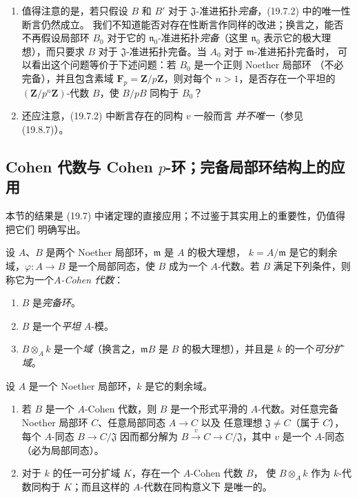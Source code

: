 \begin{remarks}[19.7.3]
\label{0.19.7.3-fr}
\begin{enumerate}
  \item[(i)] 值得注意的是，若只假设 $B$ 和 $B'$ 对于
  $\mathfrak J$-准进拓扑\emph{完备}，(19.7.2) 中的唯一性断言仍然成立。
  我们不知道能否对存在性断言作同样的改进；换言之，能否不再假设局部环
  $B_0$ 对于它的 $\mathfrak n_0$-准进拓扑\emph{完备}（这里
  $\mathfrak n_0$ 表示它的极大理想），而只要求 $B$ 对于
  $\mathfrak J$-准进拓扑完备。当 $A_0$ 对于 $\mathfrak m$-准进拓扑完备时，
  可以看出这个问题等价于下述问题：若 $B_0$ 是一个正则 Noether 局部环
  （不必完备），并且包含素域 $\mathbf F_p=\mathbf Z/p\mathbf Z$，则对每个
  $n>1$，是否存在一个平坦的 $(\mathbf Z/p^n\mathbf Z)$-代数 $B$，使
  $B/pB$ 同构于 $B_0$？
  \item[(ii)] 还应注意，(19.7.2) 中断言存在的同构 $v$ 一般而言
  \emph{并不唯一}（参见 (19.8.7)）。
\end{enumerate}
\end{remarks}

\subsection{Cohen 代数与 Cohen $p$-环；完备局部环结构上的应用}
\label{subsection:0.19.8-fr}

本节的结果是 (19.7) 中诸定理的直接应用；不过鉴于其实用上的重要性，仍值得把它们
明确写出。

\begin{definition}[19.8.1]
\label{0.19.8.1-fr}
设 $A$、$B$ 是两个 Noether 局部环，$\mathfrak m$ 是 $A$ 的极大理想，
$k=A/\mathfrak m$ 是它的剩余域，$\varphi:A\to B$ 是一个局部同态，使 $B$
成为一个 $A$-代数。若 $B$ 满足下列条件，则称它为一个\emph{$A$-Cohen 代数}：
\begin{enumerate}
  \item[(i)] $B$ 是\emph{完备环}。
  \item[(ii)] $B$ 是一个\emph{平坦} $A$-模。
  \item[(iii)] $B\otimes_A k$ 是一个\emph{域}（换言之，$\mathfrak mB$ 是 $B$
  的极大理想），并且是 $k$ 的一个\emph{可分扩域}。
\end{enumerate}
\end{definition}


\begin{theorem}[19.8.2]
\label{0.19.8.2-fr}
设 $A$ 是一个 Noether 局部环，$k$ 是它的剩余域。
\begin{enumerate}
  \item[(i)] 若 $B$ 是一个 $A$-Cohen 代数，则 $B$ 是一个形式平滑的
  $A$-代数。对任意完备 Noether 局部环 $C$、任意局部同态 $A\to C$ 以及
  任意理想 $\mathfrak J\neq C$（属于 $C$），每个 $A$-同态 $B\to C/\mathfrak J$
  因而都分解为 $B\xrightarrow{v}C\to C/\mathfrak J$，其中 $v$ 是一个
  $A$-同态（必为局部同态）。
  \item[(ii)] 对于 $k$ 的任一可分扩域 $K$，存在一个 $A$-Cohen 代数 $B$，
  使 $B\otimes_A k$ 作为 $k$-代数同构于 $K$；而且这样的 $A$-代数在同构意义下
  是唯一的。
\end{enumerate}
\end{theorem}

